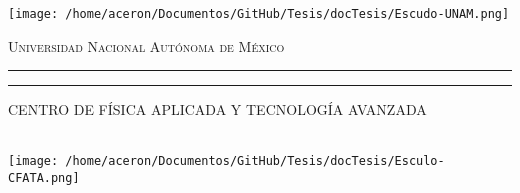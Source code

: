 \documentclass[letterpaper,12pt,oneside]{book}
\begin{document}

    \begin{titlepage}
        \thispagestyle{empty}
        \begin{minipage}[c][0.17\textheight][c]{0.25\textwidth}
            \begin{center}
                \texttt{[image: /home/aceron/Documentos/GitHub/Tesis/docTesis/Escudo-UNAM.png]}
            \end{center}
        \end{minipage}
        \begin{minipage}[c][0.195\textheight][t]{0.75\textwidth}
            \begin{center}
                \vspace{0.3cm}
                \textsc{\large Universidad Nacional Aut\'onoma de M\'exico}\\[0.5cm]
                \vspace{0.3cm}
                \hrule height2.5pt
                \vspace{.2cm}
                \hrule height1pt
                \vspace{.8cm}
                \textsc{CENTRO DE FÍSICA APLICADA Y TECNOLOGÍA AVANZADA}\\[0.5cm] %
            \end{center}
        \end{minipage}

        \begin{minipage}[c][0.81\textheight][t]{0.25\textwidth}
            \vspace*{5mm}
            \begin{center}
                \hskip2.0mm
                \vrule width1pt height13cm 
                \vspace{5mm}
                \hskip2pt
                \vrule width2.5pt height13cm
                \hskip2mm
                \vrule width1pt height13cm \\
                \vspace{5mm}
                \texttt{[image: /home/aceron/Documentos/GitHub/Tesis/docTesis/Esculo-CFATA.png]}
            \end{center}
        \end{minipage}
        \begin{minipage}[c][0.81\textheight][t]{0.75\textwidth}
            \begin{center}
                \vspace{1cm}


\end{center}
\end{minipage}
\end{titlepage}
\end{document}
